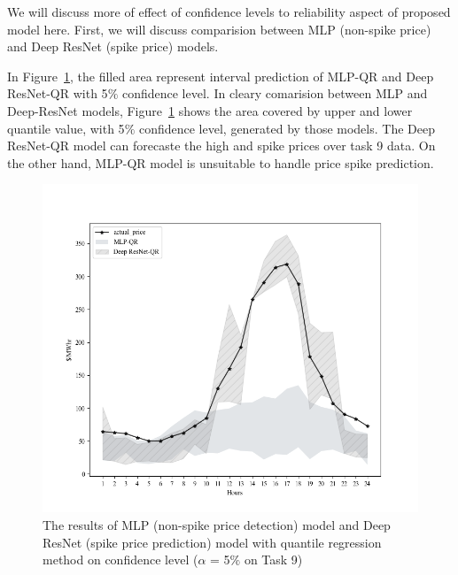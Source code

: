 \documentclass[review]{elsarticle}
\begin{document}
    We will discuss more of effect of confidence levels to reliability aspect of proposed model here. First, we will discuss comparision between MLP (non-spike price) and Deep ResNet (spike price) models.

    In Figure~\ref{Fig:compare_spike_and_non_spike_model}, the filled area represent interval prediction of MLP-QR and Deep ResNet-QR with 5$\%$ confidence level.
    In cleary comarision between MLP and Deep-ResNet models, Figure~\ref{Fig:compare_spike_and_non_spike_model} shows the area covered by upper and lower quantile value, with 5$\%$ confidence level, generated by those models.
    The Deep ResNet-QR model can forecaste the high and spike prices over task 9 data. On the other hand, MLP-QR model is unsuitable to handle price spike prediction.
    \begin{figure}[H]
      \centering
      \includegraphics[width=12cm]{Task_9-compare_between_non-spike_and_spike}
      \caption{The results of MLP (non-spike price detection) model and Deep ResNet (spike price prediction) model with quantile regression method on confidence level ($\alpha$ = 5$\%$ on Task 9)}
      \label{Fig:compare_spike_and_non_spike_model}
    \end{figure}
\end{document}
